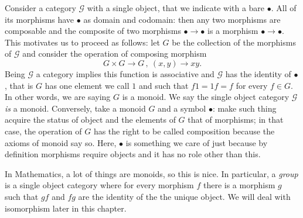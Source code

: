 \begin{example}
  Consider a category \(\mathcal{G}\) with a single object, that we indicate
  with a bare \(\bullet\). All of its morphisms have \(\bullet\) as domain and
  codomain: then any two morphisms are composable and the composite of
  two morphisms \(\bullet \to \bullet\) is a morphism
  \(\bullet \to \bullet\). This motivates us to proceed as follows: let
  \(G\) be the collection of the morphisms of \(\mathcal{G}\) and consider
  the operation of composing morphism
  \[G \times G \to G\,,\ (x, y) \to xy .\] Being \(\mathcal{G}\) a category implies
  this function is associative and \(\mathcal{G}\) has the identity of
  \(\bullet\), that is \(G\) has one element we call \(1\) and such that
  \(f1 = 1f = f\) for every \(f \in G\). In other words, we are saying
  \(G\) is a monoid. We say the single object category \(\mathcal{G}\) {\em
    is} a monoid. \newline Conversely, take a monoid \(G\) and a symbol
  \(\bullet\): make such thing acquire the status of object and the elements
  of \(G\) that of morphisms; in that case, the operation of \(G\) has
  the right to be called composition because the axioms of monoid say
  so. Here, \(\bullet\) is something we care of just because by definition
  morphisms require objects and it has no role other than this.
\end{example}

In Mathematics, a lot of things are monoids, so this is nice. In
particular, a {\em group} is a single object category where for every
morphism \(f\) there is a morphism \(g\) such that \(gf\) and \(fg\) are
the identity of the the unique object. We will deal with isomorphism
later in this chapter.

